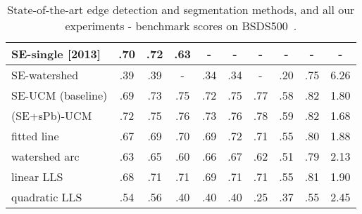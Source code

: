 \begin{table}[htbp]
\begin{tabular}{l|c|c|c||c|c|c||c|c|c|}
\hline
\hline
\multicolumn{1}{|l|}{\cite{DollarICCV13edges} SE-single [2013]} & .70 & .72 & .63 & - & - & - & - & - & - \\
\hline
\multicolumn{1}{|l|}{SE-watershed} & .39 & .39 & - & .34 & .34 & - & .20 & .75 & 6.26 \\
\hline
\multicolumn{1}{|l|}{SE-UCM (baseline)} & .69 &.73 & .75 & .72 & .75 & .77 & .58 & .82 & 1.80 \\
\hline
\multicolumn{1}{|l|}{(SE+sPb)-UCM} & .72 & .75 & .76 & .73 & .76 & .78 & .59 & .82 & 1.68 \\ %
\hline %
\hline
\multicolumn{1}{|l|}{fitted line} &  .67 & .69 & .70 & .69 & .72 & .71 & .55 & .80 & 1.88 \\ %
\hline
\multicolumn{1}{|l|}{watershed arc} & .63 & .65 & .60 & .66 & .67 & .62 & .51 & .79 & 2.13 \\ %
\hline
\hline %
\multicolumn{1}{|l|}{linear LLS} & .68 & .71 & .71 & .69 & .71 & .71 & .55 & .81 & 1.90 \\%
\hline
\multicolumn{1}{|l|}{quadratic LLS} & .54 & .56 & .40 & .40 & .40 & .25 & .37 & .55 & 2.45 \\
\hline
\hline
\end{tabular}
\caption[Benchmark scores for SoA and ours]{State-of-the-art edge detection and segmentation methods, and all our experiments - benchmark scores on BSDS500~\cite{BSDS500resources}.}
\label{tab:all-results}
\end{table}




